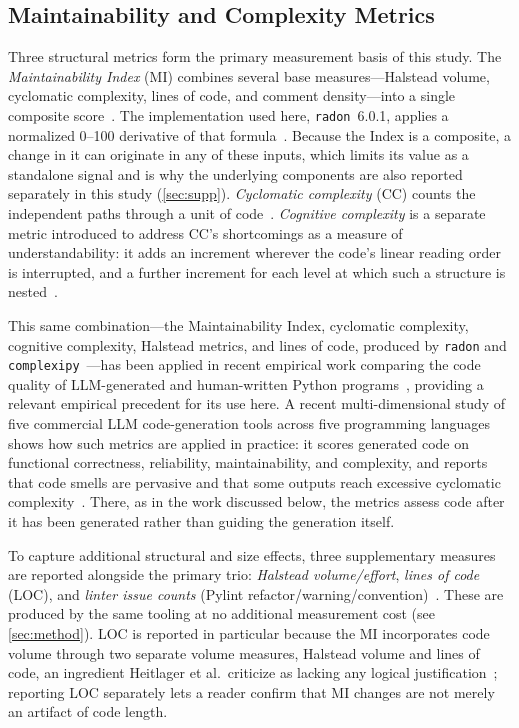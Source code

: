 \subsection{Maintainability and Complexity Metrics}
Three structural metrics form the primary measurement basis of this study.
The \emph{Maintainability Index} (MI) combines several base measures---Halstead
volume, cyclomatic complexity, lines of code, and comment density---into a
single composite score~\citep{coleman1994maintainability}. The implementation
used here, \texttt{radon}~6.0.1, applies a normalized 0--100 derivative of that
formula~\citep{radon_docs}. Because the Index is a
composite, a change in it can originate in any of
these inputs, which limits its value as a standalone signal and is why the
underlying components are also reported separately in this study
(\cref{sec:supp}). \emph{Cyclomatic complexity} (CC) counts the
independent paths through a unit of code~\citep{mccabe1976complexity}.
\emph{Cognitive complexity} is a separate metric introduced to address CC's
shortcomings as a measure of understandability: it adds an increment wherever the
code's linear reading order is interrupted, and a further increment for each
level at which such a structure is nested~\citep{cognitivecomplexity}.

This same combination---the Maintainability Index, cyclomatic complexity, cognitive
complexity, Halstead metrics, and lines of code, produced by \texttt{radon} and
\texttt{complexipy}~\citep{complexipy_tool}---has been applied in recent empirical work comparing the code
quality of LLM-generated and human-written Python
programs~\citep{jamil2025llmquality}, providing a relevant empirical precedent for
its use here. A recent multi-dimensional
study of five commercial LLM code-generation tools across five programming languages
shows how such metrics are applied in practice: it
scores generated code on functional correctness, reliability, maintainability, and
complexity, and reports that code smells are pervasive and that some outputs reach
excessive cyclomatic complexity~\citep{li2026multidim}. There, as in the work
discussed below, the metrics assess
code after it has been generated rather than guiding the generation itself.

To capture additional structural and size effects, three supplementary measures
are reported alongside the primary trio: \emph{Halstead volume/effort},
\emph{lines of code} (LOC), and \emph{linter issue counts} (Pylint
refactor/warning/convention)~\citep{pylint_tool}. These are produced by the same tooling at no
additional measurement cost (see \cref{sec:method}). LOC is reported in
particular because the MI incorporates code volume through two separate volume
measures, Halstead volume and lines of code, an ingredient Heitlager et al.\
criticize as lacking any logical
justification~\citep{heitlager2007maintainability}; reporting LOC separately lets
a reader confirm that MI changes are not merely an artifact of code length.

